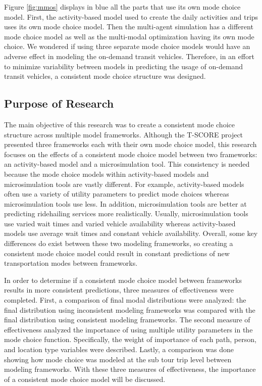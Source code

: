 \documentclass[3p, authoryear, review]{elsarticle} %
\begin{document}
Figure \ref{fig:mmos} displays in blue all the parts that use its own mode choice model. First, the activity-based model used to create the daily activities and trips uses its own mode choice model. Then the multi-agent simulation has a different mode choice model as well as the multi-modal optimization having its own mode choice. We wondered if using three separate mode choice models would have an adverse effect in modeling the on-demand transit vehicles. Therefore, in an effort to minimize variability between models in predicting the usage of on-demand transit vehicles, a consistent mode choice structure was designed.

\hypertarget{purpose-of-research}{%
\subsection{Purpose of Research}\label{purpose-of-research}}

The main objective of this research was to create a consistent mode choice structure across multiple model frameworks. Although the T-SCORE project presented three frameworks each with their own mode choice model, this research focuses on the effects of a consistent mode choice model between two frameworks: an activity-based model and a microsimulation tool. This consistency is needed because the mode choice models within activity-based models and microsimulation tools are vastly different. For example, activity-based models often use a variety of utility parameters to predict mode choices whereas microsimulation tools use less. In addition, microsimulation tools are better at predicting ridehailing services more realistically. Usually, microsimulation tools use varied wait times and varied vehicle availability whereas activity-based models use average wait times and constant vehicle availability. Overall, some key differences do exist between these two modeling frameworks, so creating a consistent mode choice model could result in constant predictions of new transportation modes between frameworks.

In order to determine if a consistent mode choice model between frameworks results in more consistent predictions, three measures of effectiveness were completed. First, a comparison of final modal distributions were analyzed: the final distribution using inconsistent modeling frameworks was compared with the final distribution using consistent modeling frameworks. The second measure of effectiveness analyzed the importance of using multiple utility parameters in the mode choice function. Specifically, the weight of importance of each path, person, and location type variables were described. Lastly, a comparison was done showing how mode choice was modeled at the sub tour trip level between modeling frameworks. With these three measures of effectiveness, the importance of a consistent mode choice model will be discussed.
\end{document}
